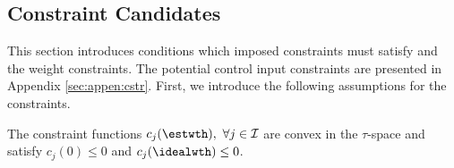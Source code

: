 \documentclass[final,5p,times,twocolumn,authoryear]{elsarticle}
\begin{document}


\subsection{Constraint Candidates}\label{sec:sub:cstr} 

This section introduces conditions which imposed constraints must satisfy and the weight constraints.
The potential control input constraints are presented in Appendix \ref{sec:appen:cstr}.
First, we introduce the following assumptions for the constraints.

\begin{assum}
    The constraint functions $c_j(\estwth),\ \forall j\in\mathcal I$ are convex in the $\tau$-space and satisfy $c_j(0) \le 0$ and $c_j(\idealwth)\le 0$.
    \label{assum:convex}
\end{assum}
\end{document}
